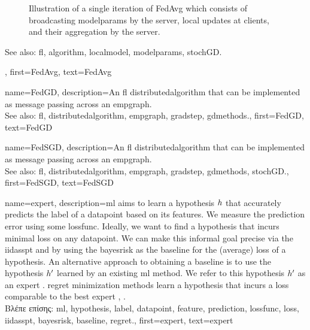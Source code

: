 {{\begin{figure}[H]
\begin{center}
		\end{center}
		\caption{Illustration of a single iteration of FedAvg which consists of broadcasting \gls{modelparams} by the 
			server, local updates at clients, and their aggregation by the server. \label{fig_single_iteration_fedavg_dict}} 
		\end{figure} 
		See also: \gls{fl}, \gls{algorithm}, \gls{localmodel}, \gls{modelparams}, \gls{stochGD}.},
	first={FedAvg},
	text={Fed\-Avg}
} 

{name={FedGD},
	description={An \gls{fl} \gls{distributedalgorithm} that 
		can be implemented as message passing across an \gls{empgraph}. \\ 
		See also: \gls{fl}, \gls{distributedalgorithm}, \gls{empgraph}, \gls{gradstep}, \gls{gdmethods}.},
	first={FedGD},
	text={FedGD}
} 

{name={FedSGD},
	description={An \gls{fl} \gls{distributedalgorithm} that 
		can be implemented as message passing across an \gls{empgraph}. \\ 
		See also: \gls{fl}, \gls{distributedalgorithm}, \gls{empgraph}, \gls{gradstep}, \gls{gdmethods}, \gls{stochGD}.},
	first={FedSGD},
	text={FedSGD}
} 

{name={expert},
	description={\gls{ml} aims to learn a \gls{hypothesis} $h$ that accurately predicts the \gls{label} 
		of a \gls{datapoint} based on its \gls{feature}s. We measure the \gls{prediction} error using 
		some \gls{lossfunc}. Ideally, we want to find a \gls{hypothesis} that incurs minimal \gls{loss} 
		on any \gls{datapoint}. We can make this informal goal precise via the \gls{iidasspt} 
		and by using the \gls{bayesrisk} as the \gls{baseline} for the (average) \gls{loss} of a \gls{hypothesis}. 
		An alternative approach to obtaining a \gls{baseline} is to use the \gls{hypothesis} $h'$ learned 
		by an existing \gls{ml} method. We refer to this \gls{hypothesis} $h'$ as an expert \cite{PredictionLearningGames}. 
		\Gls{regret} minimization methods learn a \gls{hypothesis}
		that incurs a \gls{loss} comparable to the best expert \cite{PredictionLearningGames}, \cite{HazanOCO}.\\
		\foreignlanguage{greek}{Βλέπε επίσης:} \gls{ml}, \gls{hypothesis}, \gls{label}, \gls{datapoint}, \gls{feature}, \gls{prediction}, 
		\gls{lossfunc}, \gls{loss}, \gls{iidasspt}, \gls{bayesrisk}, \gls{baseline}, \gls{regret}.},
	first={expert},
	text={expert} 
}

